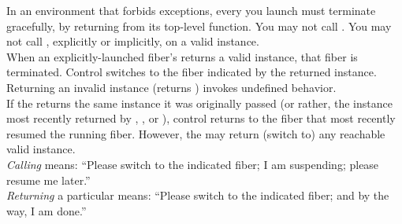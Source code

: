 In an environment that forbids exceptions, every \fiber you launch must
terminate gracefully, by returning from its top-level function. You may not
call \unwindfib. You may not call \dtor, explicitly or implicitly, on a
valid \fiber instance.\\

When an explicitly-launched fiber's \entryfn\xspace returns a valid \fiber
instance, that fiber is terminated. Control switches to the fiber indicated by
the returned \fiber instance.\\

Returning an invalid \fiber instance (\opbool returns ) invokes
undefined behavior.\\

If the \entryfn\xspace returns the same \fiber instance it was originally
passed (or rather, the \fiber instance most recently returned by \resume,
\resumewith, \xtresume or \xtresumewith), control returns to the fiber that
most recently resumed the running fiber. However, the \entryfn\xspace may
return (switch to) any reachable valid \fiber instance.\\

\emph{Calling} \resume means: ``Please switch to the indicated fiber; I
am suspending; please resume me later.''\\

\emph{Returning} a particular \fiber means: ``Please switch to the indicated
fiber; and by the way, I am done.''
